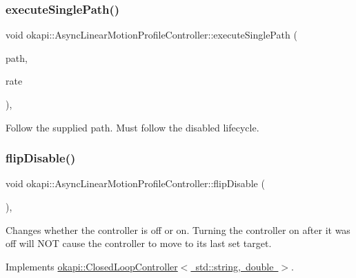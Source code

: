 \subsubsection{\texorpdfstring{executeSinglePath()}{executeSinglePath()}}
{\footnotesize\ttfamily void okapi\+::\+Async\+Linear\+Motion\+Profile\+Controller\+::execute\+Single\+Path (\begin{DoxyParamCaption}\item[{const \mbox{\hyperlink{structokapi_1_1AsyncLinearMotionProfileController_1_1TrajectoryPair}{Trajectory\+Pair}} \&}]{path,  }\item[{std\+::unique\+\_\+ptr$<$ \mbox{\hyperlink{classokapi_1_1AbstractRate}{Abstract\+Rate}} $>$}]{rate }\end{DoxyParamCaption})\hspace{0.3cm}{\ttfamily [protected]}, {\ttfamily [virtual]}}

Follow the supplied path. Must follow the disabled lifecycle. \mbox{\label{classokapi_1_1AsyncLinearMotionProfileController_a56b05f978f2a98c2183fdae0f13466e7}} 
\subsubsection{\texorpdfstring{flipDisable()}{flipDisable()}\hspace{0.1cm}{\footnotesize\ttfamily [1/2]}}
{\footnotesize\ttfamily void okapi\+::\+Async\+Linear\+Motion\+Profile\+Controller\+::flip\+Disable (\begin{DoxyParamCaption}{ }\end{DoxyParamCaption})\hspace{0.3cm}{\ttfamily [override]}, {\ttfamily [virtual]}}

Changes whether the controller is off or on. Turning the controller on after it was off will N\+OT cause the controller to move to its last set target. 

Implements \mbox{\hyperlink{classokapi_1_1ClosedLoopController_a9de69b60885df41cd2164fe1a23f34d3}{okapi\+::\+Closed\+Loop\+Controller$<$ std\+::string, double $>$}}.

\mbox{\label{classokapi_1_1AsyncLinearMotionProfileController_a3072d7ac1e5d0f387f739657e9f82fd8}} 
